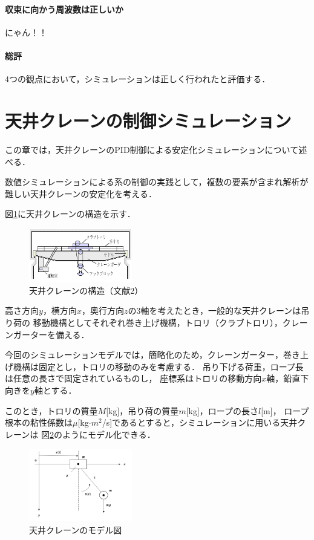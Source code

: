 \documentclass[dvipdfmx,titlepage,a4j]{jsarticle}  %
\begin{document}
\paragraph{収束に向かう周波数は正しいか\\}
にゃん！！

\paragraph{総評\\}
4つの観点において，シミュレーションは正しく行われたと評価する．

\section{天井クレーンの制御シミュレーション}
この章では，天井クレーンのPID制御による安定化シミュレーションについて述べる．

数値シミュレーションによる系の制御の実践として，複数の要素が含まれ解析が難しい天井クレーンの安定化を考える．

図\ref{fig:crane}に天井クレーンの構造を示す．

\begin{figure}[htbp]
  \centering
  \includegraphics[width=0.4\textwidth]{../graph/crane.png}
  \caption{天井クレーンの構造（文献2）}
  \label{fig:crane}
\end{figure}


高さ方向$y$，横方向$x$，奥行方向$z$の3軸を考えたとき，一般的な天井クレーンは吊り荷の
移動機構としてそれぞれ巻き上げ機構，トロリ（クラブトロリ），クレーンガーターを備える．

今回のシミュレーションモデルでは，簡略化のため，クレーンガーター，巻き上げ機構は固定とし，トロリの移動のみを考慮する．
吊り下げる荷重，ロープ長は任意の長さで固定されているものし，
座標系はトロリの移動方向$x$軸，鉛直下向きを$y$軸とする．

このとき，トロリの質量$M$[kg]，吊り荷の質量$m$[kg]，ロープの長さ$l$[m]，
ロープ根本の粘性係数は$\mu$[kg$\cdot m^2$/s]であるとすると，シミュレーションに用いる天井クレーンは
図\ref{fig:crane-po}のようにモデル化できる．

\begin{figure}[htbp]
  \centering
  \includegraphics[width=0.4\textwidth]{../graph/ex-po.png}
  \caption{天井クレーンのモデル図}
  \label{fig:crane-po}
\end{figure}
\end{document}
